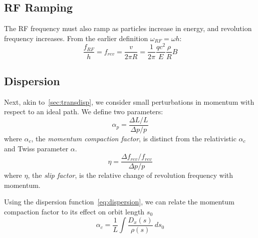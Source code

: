 \documentclass[11pt]{report}
\begin{document}
\subsection{RF Ramping}

The RF frequency must also ramp as particles increase in energy, and revolution frequency increases. From the earlier definition $\omega_{RF} = \omega h$:
\begin{equation}
  \frac{f_{RF}}h = f_{rev} = \frac{v}{2\pi R} = \frac 1{2\pi}\frac{qc^2}E\frac\rho R B
\end{equation}

\subsection{Dispersion}

Next, akin to~\autoref{sec:transdisp}, we consider small perturbations in momentum with respect to an ideal path. We define two parameters:
\begin{equation}
  \alpha_p = \frac{\Delta L/L}{\Delta p/p}
\end{equation} where $\alpha_c$, the \textit{momentum compaction factor}, is distinct from the relativistic $\alpha_c$ and Twiss parameter $\alpha$.
\begin{equation}
  \eta = \frac{\Delta f_{rev}/f_{rev}}{\Delta p/p}
\end{equation} where $\eta$, the \textit{slip factor}, is the relative change of revolution frequency with momentum.

Using the dispersion function~\autoref{eq:dispersion}, we can relate the momentum compaction factor to its effect on orbit length $s_0$~\cite[5.1]{lbd:tecker}
\begin{equation}
  \alpha_c=\frac 1L\int\frac{D_x(s)}{\rho(s)}\ ds_0
\end{equation}
\end{document}
